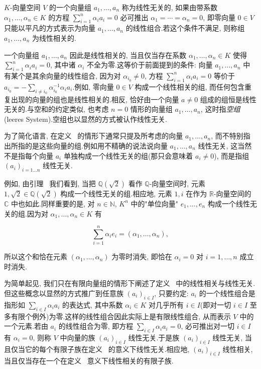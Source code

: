 \begin{definition}[线性无关]\label{def:1.5.1}
$K$-向量空间 $V$ 的一个向量组 $a_1, \ldots, a_n$ 称为线性无关的, 如果由带系数 $\alpha_1, \ldots, \alpha_n \in K$ 的方程 $\sum_{i = 1}^{n} \alpha_i a_i = 0$ 必可推出 $\alpha_1 = \cdots = \alpha_n = 0$, 即零向量 $0 \in V$ 只能以平凡的方式表示为向量 $a_1, \ldots, a_n$ 的线性组合.若这个条件不满足, 则称组 $a_1, \ldots, a_n$ 为线性相关的.
\end{definition}

一个向量组 $a_1, \ldots, a_n$ 因此是线性相关的, 当且仅当存在系数 $\alpha_1, \ldots, \alpha_n \in K$ 使得 $\sum_{i = 1}^{n} \alpha_i a_i = 0$, 其中诸 $\alpha_i$ 不全为零.这等价于前面提到的条件: 向量 $a_1, \ldots, a_n$ 中有某个是其余向量的线性组合, 因为对 $\alpha_{i_0} \neq 0$, 方程 $\sum_{i = 1}^{n} \alpha_i a_i = 0$ 等价于 $a_{i_0} = -\sum_{i \neq i_0} \alpha_{i_0}^{-1} \alpha_i a_i$.例如, 零向量 $0 \in V$ 构成一个线性相关的组, 而任何包含重复出现的向量的组也是线性相关的.相反, 恰好由一个向量 $a \neq 0$ 组成的组恒是线性无关的.与空和的约定类似, 也考虑 $n = 0$ 情形的向量组 $a_1, \ldots, a_n$, 这时指\emph{空组}(\textup{leeres System}).空组也以显然的方式被认作线性无关.

为了简化语言, 在定义~ 的情形下通常只提及所考虑的向量 $a_1, \ldots, a_n$, 而不特别指出所指的是这些向量的组.例如用不精确的说法说向量 $a_1, \ldots, a_n$ 线性无关, 这当然不是指每个向量 $a_i$ 单独构成一个线性无关的组(那只会意味着 $a_i \neq 0$), 而是指组 $(a_i)_{i = 1 \ldots n}$ 线性无关.

例如, 由引理~ 我们看到, 当把 $\mathbb{Q}(\sqrt{2})$ 看作 $\mathbb{Q}$-向量空间时, 元素 $1, \sqrt{2} \in \mathbb{Q}(\sqrt{2})$ 构成一个线性无关的组.相应地, 元素 $1, i$ 在作为 $\mathbb{R}$-向量空间的 $\mathbb{C}$ 中也如此.同样重要的是, 对 $n \in \mathbb{N}$, $K^n$ 中的"单位向量" $e_1, \ldots, e_n$ 构成一个线性无关的组.因为对 $\alpha_1, \ldots, \alpha_n \in K$ 有

\[
\sum_{i = 1}^{n} \alpha_i e_i = (\alpha_1, \ldots, \alpha_n),
\]

所以这个和恰在元素 $(\alpha_1, \ldots, \alpha_n)$ 为零时消失, 即恰在 $\alpha_i = 0$ 对 $i = 1, \ldots, n$ 成立时消失.

为简单起见, 我们只在有限向量组的情形下阐述了定义~ 中的线性相关与线性无关.但这些概念以显然的方式推广到任意族 $(a_i)_{i \in I}$, 只要约定: $a_i$ 的一个线性组合是指形如 $\sum_{i \in I} \alpha_i a_i$ 的表达式, 其中系数 $\alpha_i \in K$ 对几乎所有 $i \in I$(即对一切 $i \in I$ 至多有限个例外)为零.这样的线性组合因此实际上是有限线性组合, 从而表示 $V$ 中的一个元素.若由 $a_i$ 的线性组合为零, 即方程 $\sum_{i \in I} \alpha_i a_i = 0$, 必可推出对一切 $i \in I$ 有 $\alpha_i = 0$, 则称 $V$ 中向量的族 $(a_i)_{i \in I}$ 线性无关.于是族 $(a_i)_{i \in I}$ 线性无关, 当且仅当它的每个有限子族在定义~ 的意义下线性无关.相应地, $(a_i)_{i \in I}$ 线性相关, 当且仅当存在一个在定义~ 意义下线性相关的有限子族.

